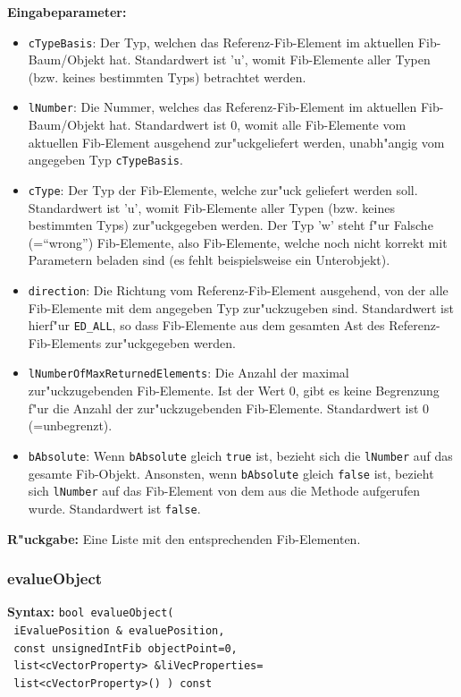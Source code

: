 \bigskip\noindent
\textbf{Eingabeparameter:}
\begin{itemize}
 \item \verb|cTypeBasis|: Der Typ, welchen das Referenz-Fib-Element im aktuellen Fib-Baum/Objekt hat. Standardwert ist 'u', womit Fib-Elemente aller Typen (bzw. keines bestimmten Typs) betrachtet werden.
 \item \verb|lNumber|: Die Nummer, welches das Referenz-Fib-Element im aktuellen Fib-Baum/Objekt hat. Standardwert ist $0$, womit alle Fib-Elemente vom aktuellen Fib-Element ausgehend zur"uckgeliefert werden, unabh"angig vom angegeben Typ \verb|cTypeBasis|.
 \item \verb|cType|: Der Typ der Fib-Elemente, welche zur"uck geliefert werden soll. Standardwert ist 'u', womit Fib-Elemente aller Typen (bzw. keines bestimmten Typs) zur"uckgegeben werden. Der Typ 'w' steht f"ur Falsche (=``wrong'') Fib-Elemente, also Fib-Elemente, welche noch nicht korrekt mit Parametern beladen sind (es fehlt beispielsweise ein Unterobjekt).
 \item \verb|direction|: Die Richtung vom Referenz-Fib-Element ausgehend, von der alle Fib-Elemente mit dem angegeben Typ zur"uckzugeben sind. Standardwert ist hierf"ur \verb|ED_ALL|, so dass Fib-Elemente aus dem gesamten Ast des Referenz-Fib-Elements zur"uckgegeben werden.
 \item \verb|lNumberOfMaxReturnedElements|: Die Anzahl der maximal zur"uckzugebenden Fib-Elemente. Ist der Wert $0$, gibt es keine Begrenzung f"ur die Anzahl der zur"uckzugebenden Fib-Elemente. Standardwert ist $0$ (=unbegrenzt).
 \item \verb|bAbsolute|: Wenn \verb|bAbsolute| gleich \verb|true| ist, bezieht sich die \verb|lNumber| auf das gesamte Fib-Objekt. Ansonsten, wenn \verb|bAbsolute| gleich \verb|false| ist, bezieht sich \verb|lNumber| auf das Fib-Element von dem aus die Methode aufgerufen wurde. Standardwert ist \verb|false|.
\end{itemize}

\bigskip\noindent
\textbf{R"uckgabe:} Eine Liste mit den entsprechenden Fib-Elementen.


\subsubsection{evalueObject}
\label{secEvalueObjectPosition}

\textbf{Syntax:} \verb|bool evalueObject(| \\\verb| iEvaluePosition & evaluePosition,| \\\verb| const unsignedIntFib objectPoint=0,| \\\verb| list<cVectorProperty> &liVecProperties=| \\\verb| list<cVectorProperty>() ) const|

